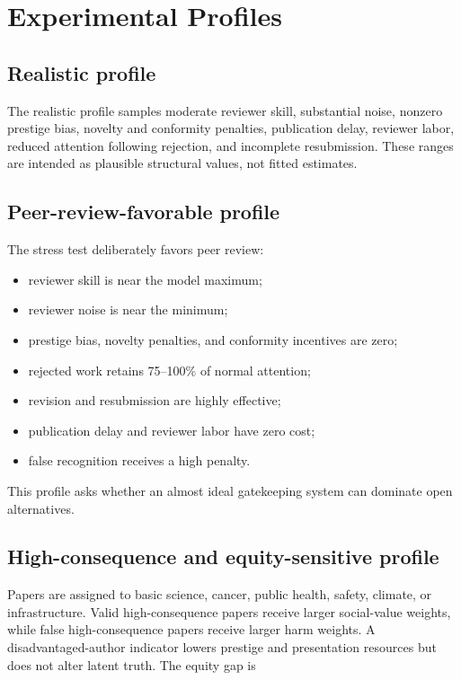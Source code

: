 \section{Experimental Profiles}

\subsection{Realistic profile}

The realistic profile samples moderate reviewer skill, substantial noise, nonzero prestige bias, novelty and conformity penalties, publication delay, reviewer labor, reduced attention following rejection, and incomplete resubmission. These ranges are intended as plausible structural values, not fitted estimates.

\subsection{Peer-review-favorable profile}

The stress test deliberately favors peer review:

\begin{itemize}
    \item reviewer skill is near the model maximum;
    \item reviewer noise is near the minimum;
    \item prestige bias, novelty penalties, and conformity incentives are zero;
    \item rejected work retains 75--100\% of normal attention;
    \item revision and resubmission are highly effective;
    \item publication delay and reviewer labor have zero cost;
    \item false recognition receives a high penalty.
\end{itemize}

This profile asks whether an almost ideal gatekeeping system can dominate open alternatives.

\subsection{High-consequence and equity-sensitive profile}

Papers are assigned to basic science, cancer, public health, safety, climate, or infrastructure. Valid high-consequence papers receive larger social-value weights, while false high-consequence papers receive larger harm weights. A disadvantaged-author indicator lowers prestige and presentation resources but does not alter latent truth. The equity gap is

